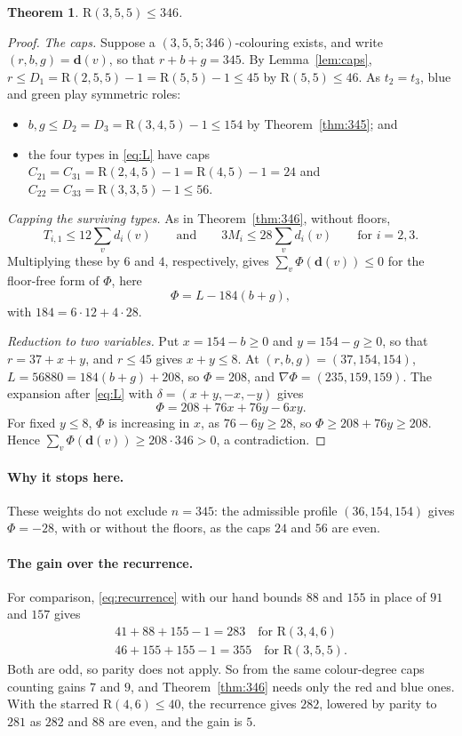 \documentclass[11pt]{article}
\theoremstyle{spacedplain}
\newtheorem{theorem}{Theorem}[section]
\theoremstyle{spaceddef}
\theoremstyle{spacedremark}
\newcommand{\R}{\mathrm{R}}
\begin{document}
\begin{theorem}\label{thm:355}
$\R(3,5,5)\le 346$.
\end{theorem}

\begin{proof}
\emph{The caps.}
Suppose a $(3,5,5;346)$-colouring exists, and write $(r,b,g)=\mathbf d(v)$, so that $r+b+g=345$.
By Lemma~\ref{lem:caps}, $r\le D_1=\R(2,5,5)-1=\R(5,5)-1\le 45$ by $\R(5,5)\le 46$.
As $t_2=t_3$, blue and green play symmetric roles:
\begin{itemize}
\item $b,g\le D_2=D_3=\R(3,4,5)-1\le 154$ by Theorem~\ref{thm:345}; and
\item the four types in \eqref{eq:L} have caps $C_{21}=C_{31}=\R(2,4,5)-1=\R(4,5)-1=24$ and $C_{22}=C_{33}=\R(3,3,5)-1\le 56$.
\end{itemize}

\emph{Capping the surviving types.}
As in Theorem~\ref{thm:346}, without floors,
\[
T_{i,1}\le 12\sum_v d_i(v)\qquad\text{and}\qquad 3M_i\le 28\sum_v d_i(v)\qquad\text{for }i=2,3.
\]
Multiplying these by $6$ and $4$, respectively, gives $\sum_v\Phi(\mathbf d(v))\le 0$ for the floor-free form of $\Phi$, here
\[
\Phi=L-184(b+g),
\]
with $184=6\cdot 12+4\cdot 28$.

\emph{Reduction to two variables.}
Put $x=154-b\ge 0$ and $y=154-g\ge 0$, so that $r=37+x+y$, and $r\le 45$ gives $x+y\le 8$.
At $(r,b,g)=(37,154,154)$, $L=56880=184(b+g)+208$, so $\Phi=208$, and $\nabla\Phi=(235,159,159)$.
The expansion after \eqref{eq:L} with $\delta=(x+y,-x,-y)$ gives
\[
\Phi=208+76x+76y-6xy .
\]
For fixed $y\le 8$, $\Phi$ is increasing in $x$, as $76-6y\ge 28$, so $\Phi\ge 208+76y\ge 208$.
Hence $\sum_v\Phi(\mathbf d(v))\ge 208\cdot 346>0$, a contradiction.
\end{proof}

\paragraph{Why it stops here.}
These weights do not exclude $n=345$: the admissible profile $(36,154,154)$ gives $\Phi=-28$, with or without the floors, as the caps $24$ and $56$ are even.

\paragraph{The gain over the recurrence.}
For comparison, \eqref{eq:recurrence} with our hand bounds $88$ and $155$ in place of $91$ and $157$ gives
\begin{gather*}
41+88+155-1=283\quad\text{for }\R(3,4,6)\\
46+155+155-1=355\quad\text{for }\R(3,5,5).
\end{gather*}
Both are odd, so parity does not apply.
So from the same colour-degree caps counting gains $7$ and $9$, and Theorem~\ref{thm:346} needs only the red and blue ones.
With the starred $\R(4,6)\le 40$, the recurrence gives $282$, lowered by parity to $281$ as $282$ and $88$ are even, and the gain is $5$.
\end{document}
